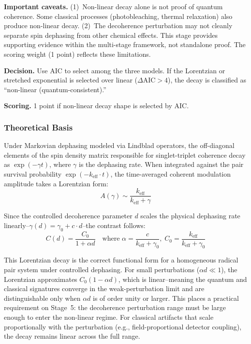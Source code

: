 \documentclass[preprint,amsmath,amssymb]{revtex4-2}
\begin{document}
\textbf{Important caveats.} (1)~Non-linear decay alone is not proof of quantum coherence. Some classical processes (photobleaching, thermal relaxation) also produce non-linear decay. (2)~The decoherence perturbation may not cleanly separate spin dephasing from other chemical effects. This stage provides supporting evidence within the multi-stage framework, not standalone proof. The scoring weight (1 point) reflects these limitations.

\textbf{Decision.} Use AIC to select among the three models. If the Lorentzian or stretched exponential is selected over linear ($\Delta\text{AIC} > 4$), the decay is classified as ``non-linear (quantum-consistent).''

\textbf{Scoring.} 1 point if non-linear decay shape is selected by AIC.

\subsubsection{Theoretical Basis}

Under Markovian dephasing modeled via Lindblad operators, the off-diagonal elements of the spin density matrix responsible for singlet-triplet coherence decay as $\exp(-\gamma t)$, where $\gamma$ is the dephasing rate. When integrated against the pair survival probability $\exp(-k_\text{eff} \cdot t)$, the time-averaged coherent modulation amplitude takes a Lorentzian form:
\begin{equation}
A(\gamma) \sim \frac{k_\text{eff}}{k_\text{eff} + \gamma}
\end{equation}

Since the controlled decoherence parameter $d$ scales the physical dephasing rate linearly--$\gamma(d) = \gamma_0 + c \cdot d$--the contrast follows:
\begin{equation}
C(d) = \frac{C_0}{1 + \alpha d} \quad \text{where } \alpha = \frac{c}{k_\text{eff} + \gamma_0},\; C_0 = \frac{k_\text{eff}}{k_\text{eff} + \gamma_0}
\end{equation}

This Lorentzian decay is the correct functional form for a homogeneous radical pair system under controlled dephasing. For small perturbations ($\alpha d \ll 1$), the Lorentzian approximates $C_0(1 - \alpha d)$, which is linear--meaning the quantum and classical signatures converge in the weak-perturbation limit and are distinguishable only when $\alpha d$ is of order unity or larger. This places a practical requirement on Stage~5: the decoherence perturbation range must be large enough to enter the non-linear regime. For classical artifacts that scale proportionally with the perturbation (e.g., field-proportional detector coupling), the decay remains linear across the full range.
\end{document}

